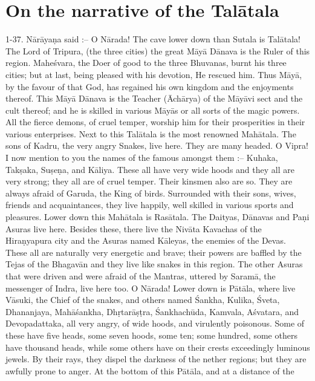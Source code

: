 \chapter{On the narrative of the Tal\=atala}

1-37. N\=ar\=aya\d{n}a said :-- O N\=arada! The cave lower down than Sutala is Tal\=atala! The Lord of Tripura, (the three cities) the great M\=ay\=a D\=anava is the Ruler of this region. Mahe\'svara, the Doer of good to the three Bhuvanas, burnt his three cities; but at last, being pleased with his devotion, He rescued him. Thus M\=ay\=a, by the favour of that God, has regained his own kingdom and the enjoyments thereof. This M\=ay\=a D\=anava is the Teacher (\=Ach\=arya) of the M\=ay\=avi sect and the cult thereof; and he is skilled in various M\=ay\=as or all sorts of the magic powers. All the fierce demons, of cruel temper, worship him for their prosperities in their various enterprises. Next to this Tal\=atala is the most renowned Mah\=atala. The sons of Kadru, the very angry Snakes, live here. They are many headed. O Vipra! I now mention to you the names of the famous amongst them :-- Kuhaka, Tak\d{s}aka, Su\d{s}e\d{n}a, and K\=aliya. These all have very wide hoods and they all are very strong; they all are of cruel temper. Their kinsmen also are so. They are always afraid of Garuda, the King of birds. Surrounded with their sons, wives, friends and acquaintances, they live happily, well skilled in various sports and pleasures. Lower down this Mah\=atala is Ras\=atala. The Daityas, D\=anavas and Pa\d{n}i Asuras live here. Besides these, there live the Niv\=ata Kavachas of the Hira\d{n}yapura city and the Asuras named K\=aleyas, the enemies of the Devas. These all are naturally very energetic and brave; their powers are baffled by the Tejas of the Bhagav\=an and they live like snakes in this region. The other Asuras that were driven and were afraid of the Mantras, uttered by Saram\=a, the messenger of Indra, live here too. O N\=arada! Lower down is P\=at\=ala, where live V\=asuki, the Chief of the snakes, and others named \'Sankha, Kulika, \'Sveta, Dhananjaya, Mah\=a\'sankha, Dh\d{r}tar\=a\d{s}\d{t}ra, \'Sankhach\=uda, Kamvala, A\'svatara, and Devopadattaka, all very angry, of wide hoods, and virulently poisonous. Some of these have five heads, some seven hoods, some ten; some hundred, some others have thousand heads, while some others have on their crests exceedingly luminous jewels. By their rays, they dispel the darkness of the nether regions; but they are awfully prone to anger. At the bottom of this P\=at\=ala, and at a distance of the

